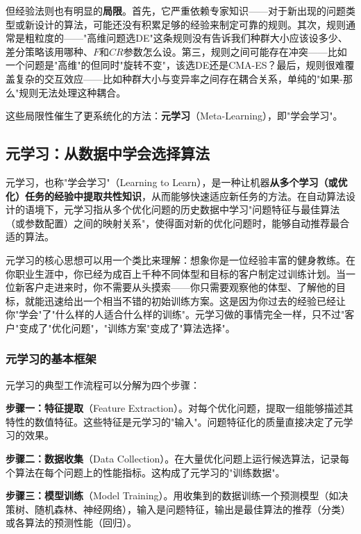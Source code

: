 \documentclass[lang=cn,zihao=-4,a4paper,fontset=windows]{beautybook}
\begin{document}
但经验法则也有明显的\textbf{局限}。首先，它严重依赖专家知识——对于新出现的问题类型或新设计的算法，可能还没有积累足够的经验来制定可靠的规则。其次，规则通常是粗粒度的——"高维问题选DE"这条规则没有告诉我们种群大小应该设多少、差分策略该用哪种、$F$和$CR$参数怎么设。第三，规则之间可能存在冲突——比如一个问题是"高维"的但同时"旋转不变"，该选DE还是CMA-ES？最后，规则很难覆盖复杂的交互效应——比如种群大小与变异率之间存在耦合关系，单纯的"如果-那么"规则无法处理这种耦合。

这些局限性催生了更系统化的方法：\textbf{元学习}（Meta-Learning），即"学会学习"。

\subsection{元学习：从数据中学会选择算法}

\begin{definition}
元学习，也称"学会学习"（Learning to Learn），是一种让机器\textbf{从多个学习（或优化）任务的经验中提取共性知识}，从而能够快速适应新任务的方法。在自动算法设计的语境下，元学习指从多个优化问题的历史数据中学习"问题特征与最佳算法（或参数配置）之间的映射关系"，使得面对新的优化问题时，能够自动推荐最合适的算法。
\end{definition}

元学习的核心思想可以用一个类比来理解：想象你是一位经验丰富的健身教练。在你职业生涯中，你已经为成百上千种不同体型和目标的客户制定过训练计划。当一位新客户走进来时，你不需要从头摸索——你只需要观察他的体型、了解他的目标，就能迅速给出一个相当不错的初始训练方案。这是因为你过去的经验已经让你"学会"了"什么样的人适合什么样的训练"。元学习做的事情完全一样，只不过"客户"变成了"优化问题"，"训练方案"变成了"算法选择"。

\subsubsection{元学习的基本框架}

元学习的典型工作流程可以分解为四个步骤：

\textbf{步骤一：特征提取}（Feature Extraction）。对每个优化问题，提取一组能够描述其特性的数值特征。这些特征是元学习的"输入"。问题特征化的质量直接决定了元学习的效果。

\textbf{步骤二：数据收集}（Data Collection）。在大量优化问题上运行候选算法，记录每个算法在每个问题上的性能指标。这构成了元学习的"训练数据"。

\textbf{步骤三：模型训练}（Model Training）。用收集到的数据训练一个预测模型（如决策树、随机森林、神经网络），输入是问题特征，输出是最佳算法的推荐（分类）或各算法的预测性能（回归）。
\end{document}
